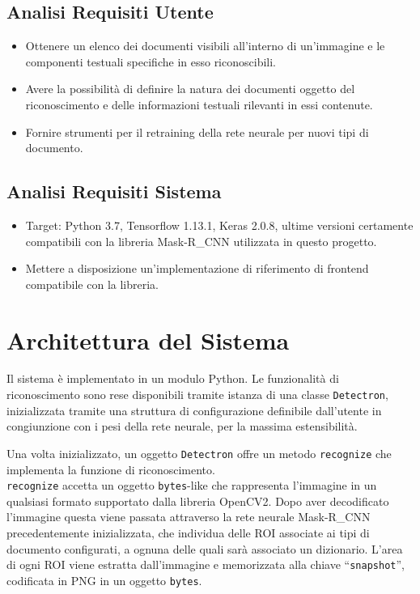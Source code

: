\documentclass[12pt,a4paper]{article}
\begin{document}
\subsection{Analisi Requisiti Utente}

\begin{itemize}
    \item Ottenere un elenco dei documenti visibili all'interno di
        un'immagine e le componenti testuali specifiche in esso
        riconoscibili.
    \item Avere la possibilità di definire la natura dei documenti
        oggetto del riconoscimento e delle informazioni testuali
        rilevanti in essi contenute.
    \item Fornire strumenti per il retraining della rete neurale per
        nuovi tipi di documento.
\end{itemize}

\subsection{Analisi Requisiti Sistema}

\begin{itemize}
    \item Target: Python 3.7, Tensorflow 1.13.1, Keras 2.0.8, ultime
        versioni certamente compatibili con la libreria Mask-R\_CNN
        utilizzata in questo progetto.
    \item Mettere a disposizione un'implementazione di riferimento di
        frontend compatibile con la libreria.
\end{itemize}

\section{Architettura del Sistema}

Il sistema è implementato in un modulo Python. Le funzionalità di
riconoscimento sono rese disponibili tramite istanza di una classe
\texttt{Detectron}, inizializzata tramite una struttura di
configurazione definibile dall'utente in congiunzione con i pesi della
rete neurale, per la massima estensibilità.

Una volta inizializzato, un oggetto \texttt{Detectron} offre un metodo
\texttt{recognize} che implementa la funzione di riconoscimento.\\
\texttt{recognize} accetta un oggetto \texttt{bytes}-like che
rappresenta l'immagine in un qualsiasi formato supportato dalla libreria
OpenCV2. Dopo aver decodificato l'immagine questa viene passata
attraverso la rete neurale Mask-R\_CNN precedentemente inizializzata, che
individua delle ROI associate ai tipi di documento configurati, a ognuna
delle quali sarà associato un dizionario. L'area di ogni ROI viene
estratta dall'immagine e memorizzata alla chiave ``\texttt{snapshot}'',
codificata in PNG in un oggetto \texttt{bytes}.
\end{document}
